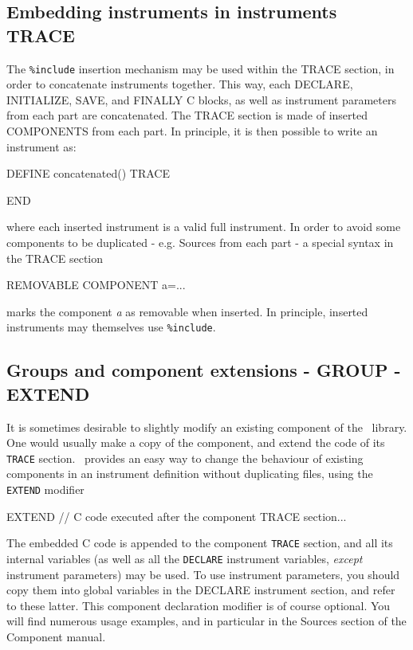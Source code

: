 \subsection{Embedding instruments in instruments TRACE}
\label{s:instrdefs-include-instr}
The \texttt{\%include} insertion mechanism may be used within the TRACE section,
in order to concatenate instruments together. This way, each DECLARE,
INITIALIZE, SAVE, and FINALLY C blocks, as well as instrument parameters from
each part are concatenated. The TRACE section is made of inserted COMPONENTS
from each part. In principle, it is then possible to write an instrument as:
\begin{mcstas}
DEFINE concatenated()
TRACE


END
\end{mcstas}
where each inserted instrument is a valid full instrument. In order to avoid
some components to be duplicated - e.g. Sources from each part - a special
syntax in the TRACE section
\begin{mcstas}
REMOVABLE COMPONENT a=...
\end{mcstas}
marks the component {\it a} as removable when inserted. In principle, inserted
instruments may themselves use \texttt{\%include}.

\subsection{Groups and component extensions - GROUP - EXTEND}
\label{s:instrdefs-extend-group}

It is sometimes desirable to slightly modify an existing component of the \MCS\ library. One would usually make a copy of the component, and extend the code of its \texttt{TRACE} section. \MCS\ provides an easy way to change the behaviour of existing components in an instrument definition without duplicating files, using the \texttt{EXTEND} modifier 
\begin{mcstas}
EXTEND
// C code executed after the component TRACE section...
\end{mcstas} 
 The embedded C code is appended to the
component \texttt{TRACE} section, and all its internal variables (as well as all
the \texttt{DECLARE} instrument variables, \emph{except} instrument parameters)
may be used. To use instrument parameters, you should copy them into global
variables in the DECLARE instrument section, and refer to these latter.  This
component declaration modifier is of course optional. You will find numerous
usage examples, and in particular in the Sources section of the Component
manual.


